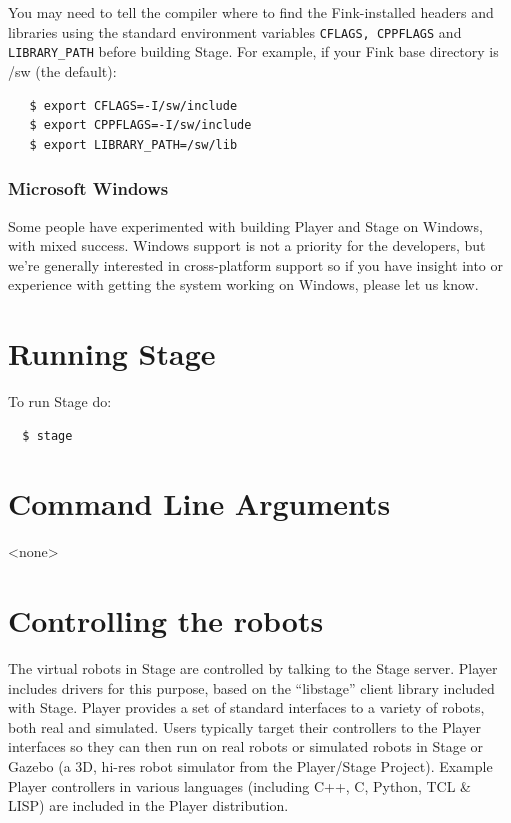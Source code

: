 \documentclass[letter,11pt,twoside]{report}
\begin{document}
You may need to tell the compiler where to find the Fink-installed
headers and libraries using the standard environment variables
\verb+CFLAGS, CPPFLAGS+ and \verb+LIBRARY_PATH+ before building
Stage. For example, if your Fink base directory is /sw (the default):

\begin{verbatim}
   $ export CFLAGS=-I/sw/include
   $ export CPPFLAGS=-I/sw/include
   $ export LIBRARY_PATH=/sw/lib
\end{verbatim}

\subsubsection{Microsoft Windows}
Some people have experimented with building Player and Stage on
Windows, with mixed success. Windows support is not a priority for the
developers, but we're generally interested in cross-platform support
so if you have insight into or experience with getting the system
working on Windows, please let us know.

\section{Running Stage}

 To run Stage do:
 \begin{verbatim} 
  $ stage
 \end{verbatim} 

\section{Command Line Arguments}

<none>

\section{Controlling the robots}

The virtual robots in Stage are controlled by talking to the Stage
server. Player includes drivers for this purpose, based on the
``libstage'' client library included with Stage. Player provides a set
of standard interfaces to a variety of robots, both real and
simulated. Users typically target their controllers to the Player
interfaces so they can then run on real robots or simulated robots in
Stage or Gazebo (a 3D, hi-res robot simulator from the Player/Stage
Project). Example Player controllers in various languages (including C++,
C, Python, TCL \& LISP) are included in the Player distribution.
\end{document}
